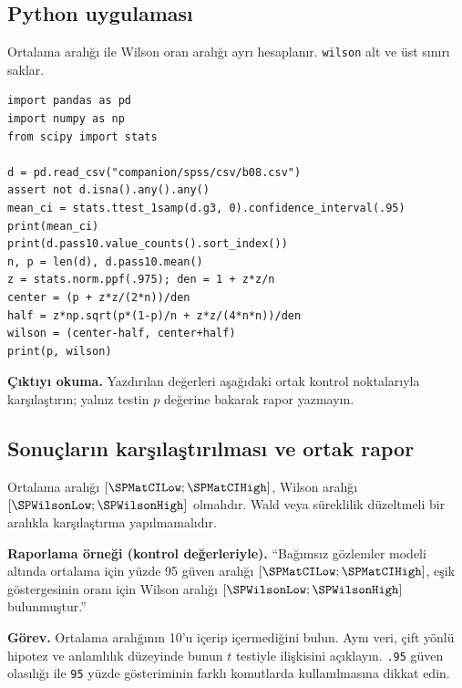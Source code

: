 \par\noindent\begin{minipage}{\linewidth}
\subsection{Python uygulaması}
\label{sec:python-b08}

Ortalama aralığı ile Wilson oran aralığı ayrı hesaplanır. \texttt{wilson} alt ve üst sınırı saklar.

\begin{lstlisting}[style=prismPythonApp]
import pandas as pd
import numpy as np
from scipy import stats

d = pd.read_csv("companion/spss/csv/b08.csv")
assert not d.isna().any().any()
mean_ci = stats.ttest_1samp(d.g3, 0).confidence_interval(.95)
print(mean_ci)
print(d.pass10.value_counts().sort_index())
n, p = len(d), d.pass10.mean()
z = stats.norm.ppf(.975); den = 1 + z*z/n
center = (p + z*z/(2*n))/den
half = z*np.sqrt(p*(1-p)/n + z*z/(4*n*n))/den
wilson = (center-half, center+half)
print(p, wilson)
\end{lstlisting}

\textbf{Çıktıyı okuma.} Yazdırılan değerleri aşağıdaki ortak kontrol noktalarıyla karşılaştırın; yalnız testin $p$ değerine bakarak rapor yazmayın.
\end{minipage}\par

\subsection{Sonuçların karşılaştırılması ve ortak rapor}
\begin{outputguidebox}
Ortalama aralığı $[\SPMatCILow;\SPMatCIHigh]$, Wilson aralığı $[\SPWilsonLow;\SPWilsonHigh]$ olmalıdır. Wald veya süreklilik düzeltmeli bir aralıkla karşılaştırma yapılmamalıdır.
\end{outputguidebox}

\textbf{Raporlama örneği (kontrol değerleriyle).}
``Bağımsız gözlemler modeli altında ortalama için yüzde 95 güven aralığı $[\SPMatCILow;\SPMatCIHigh]$, eşik göstergesinin oranı için Wilson aralığı $[\SPWilsonLow;\SPWilsonHigh]$ bulunmuştur.''


\textbf{Görev.} Ortalama aralığının 10'u içerip içermediğini bulun.
Aynı veri, çift yönlü hipotez ve anlamlılık düzeyinde bunun $t$ testiyle
ilişkisini açıklayın. \texttt{.95} güven olasılığı ile \texttt{95} yüzde
gösteriminin farklı komutlarda kullanılmasına dikkat edin.